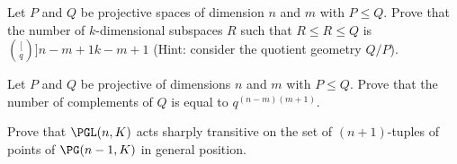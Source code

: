 \begin{exercise}
    Let $P$ and $Q$ be projective spaces of dimension $n$ and $m$ with $P\leq Q$. Prove that the number of $k$-dimensional subspaces $R$ such that $R\leq R\leq Q$ is $\binom[q]{n-m+1}{k-m+1}$ (Hint: consider the quotient geometry $Q/P$).
\end{exercise}

\begin{exercise}
    Let $P$ and $Q$ be projective of dimensions $n$ and $m$ with $P\leq Q$. Prove that the number of complements of $Q$ is equal to $q^{(n-m)(m+1)}$.
\end{exercise}

\begin{exercise}
    Prove that $\PGL(n,K)$ acts sharply transitive on the set of $(n+1)$-tuples of points of $\PG(n-1,K)$ in general position.
\end{exercise}
